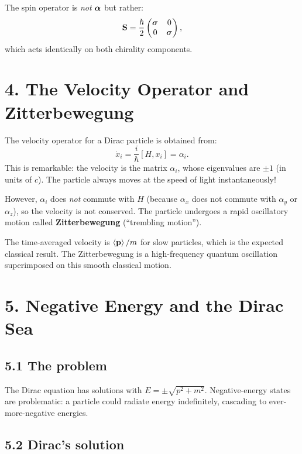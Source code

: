 \documentclass[12pt,a4paper]{article}
\begin{document}
The spin operator is \emph{not} $\vb*{\alpha}$ but rather:
\[
    \vb{S} = \frac{\hbar}{2}\begin{pmatrix} \vb*{\sigma} & 0 \\ 0 & \vb*{\sigma} \end{pmatrix},
\]
which acts identically on both chirality components.

\section{4. The Velocity Operator and Zitterbewegung}

The velocity operator for a Dirac particle is obtained from:
\[
    \dot{x}_i = \frac{i}{\hbar}[H, x_i] = \alpha_i.
\]
This is remarkable: the velocity is the matrix $\alpha_i$, whose eigenvalues are $\pm 1$ (in units of $c$).  The particle always moves at the speed of light instantaneously!

However, $\alpha_i$ does \emph{not} commute with $H$ (because $\alpha_x$ does not commute with $\alpha_y$ or $\alpha_z$), so the velocity is not conserved.  The particle undergoes a rapid oscillatory motion called \textbf{Zitterbewegung} (``trembling motion'').

The time-averaged velocity is $\expval{\vb{p}}/m$ for slow particles, which is the expected classical result.  The Zitterbewegung is a high-frequency quantum oscillation superimposed on this smooth classical motion.

\section{5. Negative Energy and the Dirac Sea}

\subsection{5.1 The problem}

The Dirac equation has solutions with $E = \pm\sqrt{p^2 + m^2}$.  Negative-energy states are problematic: a particle could radiate energy indefinitely, cascading to ever-more-negative energies.

\subsection{5.2 Dirac's solution}
\end{document}
